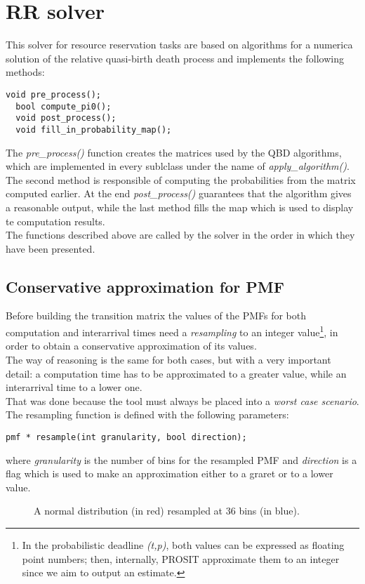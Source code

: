 \section{RR solver}
This solver for resource reservation tasks are based on algorithms for a numerica solution of the relative quasi-birth death process and implements the following methods:
\begin{lstlisting}[frame=bt]
  void pre_process();
  bool compute_pi0();
  void post_process();
  void fill_in_probability_map();
\end{lstlisting}
The \emph{pre\_process()} function creates the matrices used by the QBD algorithms, which are implemented in every sublclass under the name of \emph{apply\_algorithm()}. The second method is responsible of computing the probabilities from the matrix computed earlier. At the end \emph{post\_process()} guarantees that the algorithm gives a reasonable output, while the last method fills the map which is used to display te computation results.\\
The functions described above are called by the solver in the order in which they have been presented.

\subsection{Conservative approximation for PMF}
Before building the transition matrix the values of the PMFs for both computation and interarrival times need a \emph{resampling} to an integer value\footnote{In the probabilistic deadline \emph{(t,p)}, both values can be expressed as floating point numbers; then, internally, PROSIT approximate them to an integer since we aim to output an estimate.}, in order to obtain a conservative approximation of its values.\\
The way of reasoning is the same for both cases, but with a very important detail: a computation time has to be approximated to a greater value, while an interarrival time to a lower one.\\ 
That was done because the tool must always be placed into a \emph{worst case scenario}. The resampling function is defined with the following parameters:
\begin{lstlisting}[frame=bt]
  pmf * resample(int granularity, bool direction);
\end{lstlisting}

where \emph{granularity} is the number of bins for the resampled PMF and \emph{direction} is a flag which is used to make an approximation either to a graret or to a lower value.\\
\begin{figure}[H]
  \caption{A normal distribution (in red) resampled at 36 bins (in blue).}
  \label{resample}
\end{figure}

